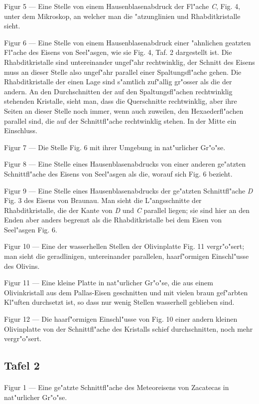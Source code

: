 \documentclass[a4paper, 11pt, oneside]{article}
\begin{document}
Figur 5 --- Eine Stelle von einem Hausenblasenabdruck der Fl"ache \emph{C}, Fig. 4, unter dem Mikroskop, an welcher man die "atzunglinien und Rhabditkristalle sieht.

Figur 6 --- Eine Stelle von einem Hausenblasenabdruck einer "ahnlichen geatzten Fl"ache des Eisens von Seel"asgen, wie sie Fig. 4, Taf. 2 dargestellt ist. Die Rhabditkristalle sind untereinander ungef"ahr rechtwinklig, der Schnitt des Eisens muss an dieser Stelle also ungef"ahr parallel einer Spaltungsfl"ache gehen. Die Rhabditkristalle der einen Lage sind s"amtlich zuf"allig gr"osser als die der andern. An den Durchschnitten der auf den Spaltungsfl"achen rechtwinklig stehenden Kristalle, sieht man, dass die Querschnitte rechtwinklig, aber ihre Seiten an dieser Stelle noch immer, wenn auch zuweilen, den Hexaederfl"achen parallel sind, die auf der Schnittfl"ache rechtwinklig stehen. In der Mitte ein Einschluss.

Figur 7 --- Die Stelle Fig. 6 mit ihrer Umgebung in nat"urlicher Gr"o"se.

Figur 8 --- Eine Stelle eines Hausenblasenabdrucks von einer anderen ge"atzten Schnittfl"ache des Eisens von Seel"asgen als die, worauf sich Fig. 6 bezieht.

Figur 9 --- Eine Stelle eines Hausenblasenabdrucks der ge"atzten Schnittfl"ache \emph{D} Fig. 3 des Eisens von Braunau. Man sieht die L"angsschnitte der Rhabditkristalle, die der Kante von \emph{D} und \emph{C} parallel liegen; sie sind hier an den Enden aber anders begrenzt als die Rhabditkristalle bei dem Eisen von Seel"asgen Fig. 6.

Figur 10 --- Eine der wasserhellen Stellen der Olivinplatte Fig. 11 vergr"o"sert; man sieht die geradlinigen, untereinander parallelen, haarf"ormigen Einschl"usse des Olivins.

Figur 11 --- Eine kleine Platte in nat"urlicher Gr"o"se, die aus einem Olivinkristall aus dem Pallas-Eisen geschnitten und mit vielen braun gef"arbten Kl"uften durchsetzt ist, so dass nur wenig Stellen wasserhell geblieben sind.

Figur 12 --- Die haarf"ormigen Einschl"usse von Fig. 10 einer andern kleinen Olivinplatte von der Schnittfl"ache des Kristalls schief durchschnitten, noch mehr vergr"o"sert.

\subsection{Tafel 2}
\paragraph{}
Figur 1 --- Eine ge"atzte Schnittfl"ache des Meteoreisens von Zacatecas in nat"urlicher Gr"o"se.
\end{document}
